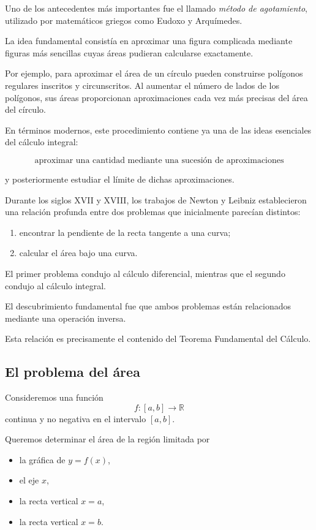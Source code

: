 \documentclass[12pt]{article}
\begin{document}
Uno de los antecedentes más importantes fue el llamado
\emph{método de agotamiento}, utilizado por matemáticos griegos como
Eudoxo y Arquímedes.

La idea fundamental consistía en aproximar una figura complicada mediante
figuras más sencillas cuyas áreas pudieran calcularse exactamente.

Por ejemplo, para aproximar el área de un círculo pueden construirse
polígonos regulares inscritos y circunscritos. Al aumentar el número de
lados de los polígonos, sus áreas proporcionan aproximaciones cada vez
más precisas del área del círculo.

En términos modernos, este procedimiento contiene ya una de las ideas
esenciales del cálculo integral:

\[
\boxed{
\text{aproximar una cantidad mediante una sucesión de aproximaciones}
}
\]

y posteriormente estudiar el límite de dichas aproximaciones.

Durante los siglos XVII y XVIII, los trabajos de Newton y Leibniz
establecieron una relación profunda entre dos problemas que inicialmente
parecían distintos:

\begin{enumerate}
    \item encontrar la pendiente de la recta tangente a una curva;
    \item calcular el área bajo una curva.
\end{enumerate}

El primer problema condujo al cálculo diferencial, mientras que el segundo
condujo al cálculo integral.

El descubrimiento fundamental fue que ambos problemas están relacionados
mediante una operación inversa.

Esta relación es precisamente el contenido del Teorema Fundamental del
Cálculo.

\subsection{El problema del área}

Consideremos una función
\[
f:[a,b]\longrightarrow\mathbb{R}
\]
continua y no negativa en el intervalo $[a,b]$.

Queremos determinar el área de la región limitada por

\begin{itemize}
    \item la gráfica de $y=f(x)$,
    \item el eje $x$,
    \item la recta vertical $x=a$,
    \item la recta vertical $x=b$.
\end{itemize}
\end{document}
